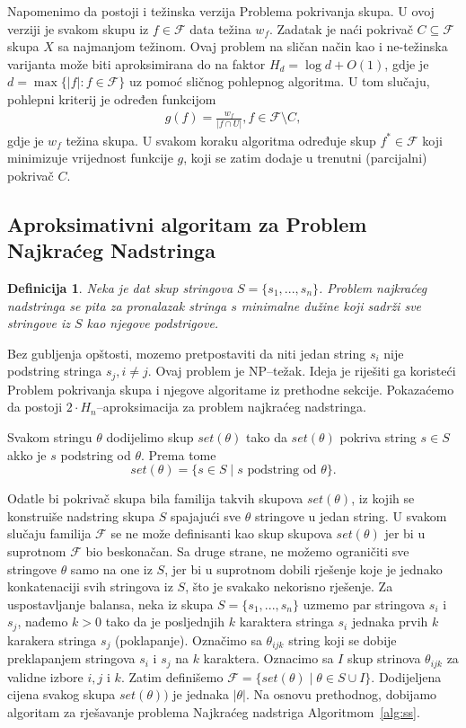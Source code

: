 \documentclass[a4paper, utf8, 11pt, colorlinks]{book}
\newtheorem{definition}{Definicija}
\begin{document}
Napomenimo da postoji i težinska verzija Problema pokrivanja skupa. U ovoj verziji je svakom skupu iz $f \in\mathcal{F}$ data težina $w_f$. Zadatak je naći pokrivač $C \subseteq \mathcal{F}$ skupa $X$ sa najmanjom težinom. Ovaj problem na sličan način kao i ne-težinska varijanta može biti aproksimirana do na faktor $H_d= \log d+O(1)$, gdje je $d= \max\{|f|:f \in \mathcal{F}\}$ uz pomoć sličnog pohlepnog algoritma. U tom slučaju, pohlepni kriterij je određen funkcijom 
\begin{align}
	g(f) = \frac{w_f}{|f \cap U|}, f \in \mathcal{F}\setminus C,
\end{align}
gdje je $w_f$ težina skupa. U svakom koraku algoritma određuje skup $f^* \in \mathcal{F}$ koji minimizuje vrijednost funkcije $g$, koji se zatim dodaje u trenutni (parcijalni) pokrivač $C$.

\subsection{Aproksimativni algoritam za Problem Najkraćeg Nadstringa}


\begin{definition}
   Neka je dat skup stringova $S=\{s_1,...,s_n\}$. Problem najkraćeg nadstringa se pita za pronalazak stringa $s$ minimalne dužine koji sadrži sve stringove iz $S$ kao njegove podstrigove. 
  \end{definition}
Bez gubljenja opštosti, mozemo pretpostaviti da niti jedan string $s_i$ nije podstring stringa $s_j, i\neq j$.
Ovaj problem je NP--težak. Ideja je riješiti ga koristeći Problem pokrivanja skupa i 
njegove algoritame iz prethodne sekcije. Pokazaćemo da postoji $2\cdot H_n$--aproksimacija za problem najkraćeg nadstringa. 

 Svakom stringu $\theta$ dodijelimo skup $set(\theta)$ tako da   $set(\theta)$ pokriva string $s\in S$ akko 
je $s$ podstring od $\theta$. Prema tome 
$$set(\theta) = \{ s \in S \mid s \mbox{  podstring od }\theta \}.$$

 Odatle bi pokrivač skupa bila familija takvih skupova $set(\theta)$, iz kojih se konstruiše nadstring skupa $S$ spajajući sve $\theta$ stringove u jedan string. U svakom slučaju familija  $\mathcal{F}$ se ne može definisanti kao skup skupova $set(\theta)$ jer bi u suprotnom $\mathcal{F}$ bio beskonačan. Sa druge strane, ne možemo ograničiti sve stringove $\theta$ samo na one iz $S$, jer bi u suprotnom dobili rješenje koje je jednako konkatenaciji svih stringova iz $S$, što je svakako nekorisno rješenje. Za uspostavljanje balansa, neka iz skupa $S=\{s_1,...,s_n\}$ uzmemo par stringova $s_i$ i $s_j$, nađemo $k>0$  tako da je posljednjih $k$ karaktera stringa $s_i$ jednaka prvih $k$ karakera stringa $s_j$ (poklapanje). Označimo sa $\theta_{ijk}$ string koji se 
dobije preklapanjem stringova $s_i$ i $s_j$ na $k$ karaktera. Oznacimo sa $I$ skup strinova $\theta_{ijk}$  za validne izbore $i,j$ i $k$. Zatim definišemo $\mathcal{F}=\{set(\theta) \mid  \theta \in S \cup I\}$. Dodijeljena cijena svakog skupa $set(\theta))$ je jednaka $|\theta|$. Na osnovu prethodnog, dobijamo algoritam za rješavanje problema Najkraćeg nadstriga Algoritmom~\ref{alg:ss}. 
\end{document}
